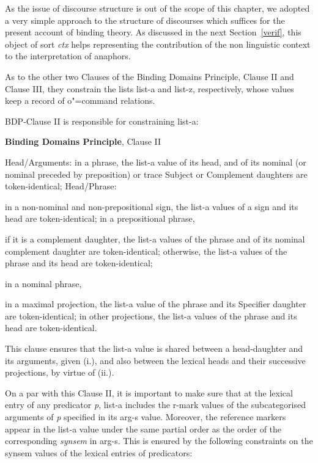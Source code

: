 \documentclass[output=paper
,modfonts
,nonflat]{langsci/langscibook}
\begin{document}
As the issue of discourse structure is out
of the scope of this chapter, we adopted a very simple approach to the 
structure of discourses
which suffices for the present account of binding theory.
As discussed in the next \mbox{Section \ref{verif},} this object
of sort \emph{ctx} helps representing the contribution of the non linguistic context to the 
interpretation of anaphors.

 
As to the other two Clauses of the Binding Domains Principle, 
Clause II and Clause III,
they constrain the lists {\sc list-a} and {\sc list-z}, respectively,
whose values keep a record of o"=command relations.

BDP-Clause II is responsible for constraining {\sc list-a}:

\begin{exe}
\ex
\textbf{Binding Domains Principle}, Clause II
\begin{xlisti}
\ex	Head/Arguments: in a phrase, the {\sc list-a} value of its head, and of its nominal (or
nominal preceded by preposition) or trace Subject or Complement daughters are
token-identical;
\ex Head/Phrase:
\begin{xlisti}
\ex	in a non-nominal and non-prepositional sign, the {\sc list-a} values of a sign and its
head are token-identical;
\ex	in a prepositional phrase,
\begin{itemize}
\ex if it is a complement daughter, the {\sc list-a} values of the phrase and of its nominal
complement daughter are token-identical;
\ex otherwise, the {\sc list-a} values of the phrase and its head are token-identical;
\end{itemize}
\ex	in a nominal phrase,
\begin{itemize} 
\ex in a maximal projection, the {\sc list-a} value of the phrase and its Specifier daughter
are token-identical;
\ex in other projections, the {\sc list-a} values of the phrase and its head are
token-identical.
\end{itemize}
\end{xlisti}
\end{xlisti}
\end{exe}

This clause ensures that the {\sc list-a} value is shared between a head-daughter and its arguments, given (i.),
and also between the lexical heads and their successive projections, by virtue of (ii.).

On a par with this Clause II, it is important to make sure
that at the lexical entry of any predicator {\it p}, {\sc list-a} includes 
the {\sc r-mark}
values of the  subcategorised arguments of {\it p} specified in its
{\sc arg-s} value. Moreover, the reference markers appear in the {\sc list-a} 
value under the same partial order as the order of the corresponding \emph{synsem} 
in {\sc arg-s}. This is ensured by the following constraints on the {\sc synsem} values
of the lexical entries of predicators:
\end{document}
